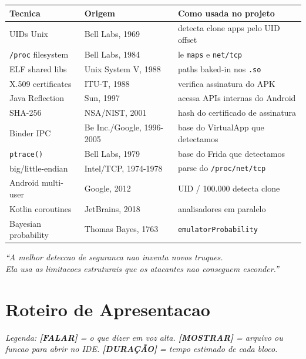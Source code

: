 \documentclass[12pt,a4paper]{article}
\begin{document}
\begin{center}
\begin{tabular}{p{3cm}p{4cm}p{6cm}}
\toprule
\textbf{Tecnica} & \textbf{Origem} & \textbf{Como usada no projeto} \\
\midrule
UIDs Unix & Bell Labs, 1969 & detecta clone apps pelo UID offset \\
\texttt{/proc} filesystem & Bell Labs, 1984 & le \texttt{maps} e \texttt{net/tcp} \\
ELF shared libs & Unix System V, 1988 & paths baked-in nos \texttt{.so} \\
X.509 certificates & ITU-T, 1988 & verifica assinatura do APK \\
Java Reflection & Sun, 1997 & acessa APIs internas do Android \\
SHA-256 & NSA/NIST, 2001 & hash do certificado de assinatura \\
Binder IPC & Be Inc./Google, 1996-2005 & base do VirtualApp que detectamos \\
\texttt{ptrace()} & Bell Labs, 1979 & base do Frida que detectamos \\
big/little-endian & Intel/TCP, 1974-1978 & parse do \texttt{/proc/net/tcp} \\
Android multi-user & Google, 2012 & UID / 100.000 detecta clone \\
Kotlin coroutines & JetBrains, 2018 & analisadores em paralelo \\
Bayesian probability & Thomas Bayes, 1763 & \texttt{emulatorProbability} \\
\bottomrule
\end{tabular}
\end{center}

\vspace{1cm}

\begin{center}
\textit{``A melhor deteccao de seguranca nao inventa novos truques.\\
Ela usa as limitacoes estruturais que os atacantes nao conseguem esconder.''}
\end{center}


\newpage

\section{Roteiro de Apresentacao}

\begin{mdframed}[backgroundcolor=codebg, linecolor=codeframe, linewidth=1pt,
  innerleftmargin=14pt, innerrightmargin=14pt, innertopmargin=10pt, innerbottommargin=10pt]
{\small\textit{Legenda: \textbf{[FALAR]} = o que dizer em voz alta.
\textbf{[MOSTRAR]} = arquivo ou funcao para abrir no IDE.
\textbf{[DURAÇÃO]} = tempo estimado de cada bloco.}}
\end{mdframed}
\end{document}
